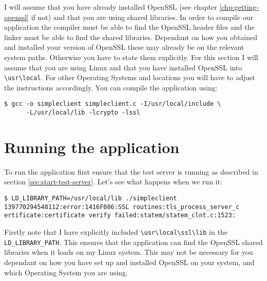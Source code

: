 I will assume that you have already installed OpenSSL (see chapter
\ref{chp:getting-openssl} if not) and that you are using shared libraries. In
order to compile our  application the compiler must be able to find the OpenSSL
header files and the  linker must be able to find the shared libraries.
Dependant on how you obtained  and installed your version of OpenSSL these may
already be on the relevant  system paths. Otherwise you have to state them
explicitly. For this section I  will assume that you are using Linux and that
you have installed OpenSSL into \verb!\usr\local!. For other Operating
Systems and locations you will have to adjust the instructions accordingly. You
can compile the application using:

\begin{verbatim}
$ gcc -o simpleclient simpleclient.c -I/usr/local/include \
      -L/usr/local/lib -lcrypto -lssl
\end{verbatim}

\section {Running the application}

To run the application first ensure that the test server is running as 
described in section \ref{sec:start-test-server}. Let's see what happens when 
we run it:

\begin{verbatim}
$ LD_LIBRARY_PATH=/usr/local/lib ./simpleclient
139770294548112:error:1416F086:SSL routines:tls_process_server_c
ertificate:certificate verify failed:statem/statem_clnt.c:1523:
\end{verbatim}

Firstly note that I have explicitly included \verb!\usr\local\ssl\lib! in the 
\verb!LD_LIBRARY_PATH!. This ensures that the application can find the OpenSSL 
shared libraries when it loads on my Linux system. This may not be necessary for
you dependant on how you have set up and installed OpenSSL on your system, and 
which Operating System you are using.

